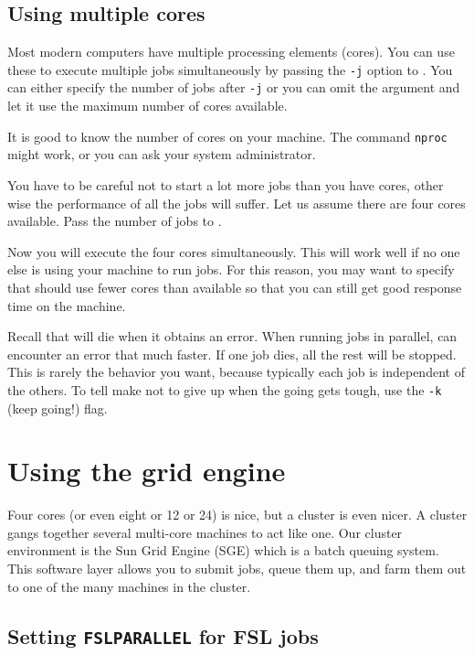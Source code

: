 \subsection{Using multiple cores}

Most modern computers have multiple processing elements (cores). You can use these to execute multiple jobs simultaneously by passing the \texttt{-j} option to \maken. You can either specify the number of jobs after \texttt{-j} or you can omit the argument and let it use the maximum number of cores available. 

It is good to know the number of cores on your machine. The command \texttt{nproc} might work, or you can ask your system administrator. 

You have to be careful not to start a lot more jobs than you have cores, other wise the performance of all the jobs will suffer. Let us assume there are four cores available. Pass the number of jobs to \maken. 

Now you will execute the four cores simultaneously. This will work well if no one else is using your machine to run jobs. For this reason, you may want to specify that \maken{} should use fewer cores than available so that you can still get good response time on the machine. 

Recall that \maken{} will die when it obtains an error. When running jobs in parallel, \maken{} can encounter an error that much faster. If one job dies, all the rest will be stopped. This is rarely the behavior you want, because typically each job is independent of the others. To tell make not to give up when the going gets tough, use the \texttt{-k} (keep going!) flag.

\section{Using the grid engine}

Four cores (or even eight or 12 or 24) is nice, but a cluster is even nicer. A cluster gangs together several multi-core machines to act like one. Our cluster environment is the Sun Grid Engine (SGE) which is a batch queuing system. This software layer allows you to submit jobs, queue them up, and farm them out to one of the many machines in the cluster.

\subsection{Setting \texttt{FSLPARALLEL} for FSL jobs}

